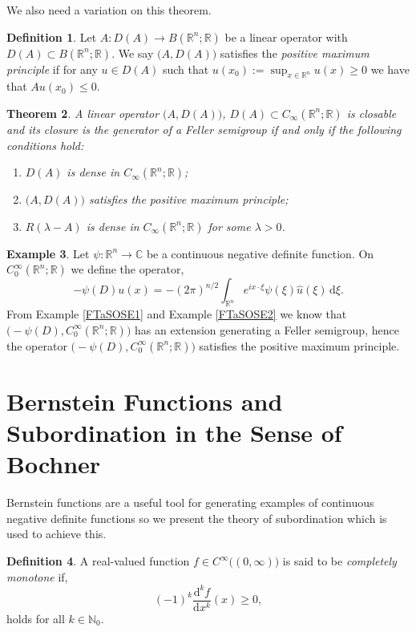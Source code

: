 \documentclass[a4paper, 12pt]{report}
\newtheorem{theorem}{Theorem}[section]
\theoremstyle{remark}
\theoremstyle{definition}
\newtheorem{definition}[theorem]{Definition}
\newtheorem{example}[theorem]{Example}
\begin{document}
We also need a variation on this theorem.

\begin{definition}
Let $A : D(A) \to B(\mathbb{R}^n; \mathbb{R})$ be a linear operator with $D(A) \subset B(\mathbb{R}^n; \mathbb{R})$.  We say $\big(A, D(A)\big)$ satisfies the \emph{positive maximum principle} if for any $u \in D(A)$ such that $u(x_0) := \sup_{x \in \mathbb{R}^n}u(x) \ge 0$ we have that $Au(x_0) \le 0$.
\end{definition}

\begin{theorem}
A linear operator $\big(A, D(A)\big)$, $D(A) \subset C_\infty(\mathbb{R}^n; \mathbb{R})$ is closable and its closure is the generator of a Feller semigroup if and only if the following conditions hold:
\begin{enumerate}
\item $D(A)$ is dense in $C_\infty(\mathbb{R}^n; \mathbb{R})$;

\item $\big(A, D(A)\big)$ satisfies the positive maximum principle;

\item $R(\lambda - A)$ is dense in $C_\infty(\mathbb{R}^n; \mathbb{R})$ for some $\lambda > 0$.
\end{enumerate}
\end{theorem}

\begin{example}
Let $\psi : \mathbb{R}^n \to \mathbb{C}$ be a continuous negative definite function.  On $C_0^\infty(\mathbb{R}^n; \mathbb{R})$ we define the operator,
$$
-\psi(D)u(x) = -(2\pi)^{n/2}\int_{\mathbb{R}^n}e^{ix\cdot\xi}\psi(\xi)\hat{u}(\xi)\,\mathrm{d}\xi.
$$
From Example \ref{FTaSOSE1} and Example \ref{FTaSOSE2} we know that $\big(-\psi(D), C_0^\infty(\mathbb{R}^n; \mathbb{R})\big)$ has an extension generating a Feller semigroup, hence the operator $\big(-\psi(D), C_0^\infty(\mathbb{R}^n; \mathbb{R})\big)$ satisfies the positive maximum principle.
\end{example}


\section{Bernstein Functions and Subordination in the Sense of Bochner}\label{BFaSitSoB}

Bernstein functions are a useful tool for generating examples of continuous negative definite functions so we present the theory of subordination which is used to achieve this.
\begin{definition}
A real-valued function $f \in C^\infty\big((0, \infty)\big)$ is said to be \emph{completely monotone} if,
\begin{equation}
(-1)^k\frac{\mathrm{d}^kf}{\mathrm{d}x^k}(x) \ge 0,
\end{equation}
holds for all $k \in \mathbb{N}_0$.
\end{definition}
\end{document}
